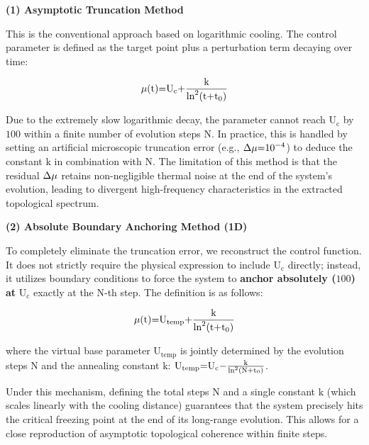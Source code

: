 \documentclass[fractalfract,article,submit,oneauthor,pdftex]{Definitions/mdpi}
\begin{document}
\textbf{(1) Asymptotic Truncation Method}

This is the conventional approach based on logarithmic cooling. The
control parameter is defined as the target point plus a perturbation
term decaying over time:

\begin{equation}
\text{\ensuremath{\mu}}\text{(}\text{t}\text{)=}\text{U}_{\text{c}}\text{+}\frac{\text{k}}{\text{ln}^{\text{2}}\text{(}\text{t}\text{+}\text{t}_{\text{0}}\text{)}}
\end{equation}

Due to the extremely slow logarithmic decay, the parameter cannot reach
\(\text{U}_{\text{c}}\) by \(\text{100}\) within a finite number of
evolution steps \(\text{N}\). In practice, this is handled by setting an
artificial microscopic truncation error (e.g.,
\(\text{\ensuremath{\Delta}}\text{\ensuremath{\mu}}\text{=}\text{10}^{\text{\ensuremath{-}4}}\)) to deduce the
constant \(\text{k}\) in combination with \(\text{N}\). The limitation
of this method is that the residual \(\text{\ensuremath{\Delta}}\text{\ensuremath{\mu}}\) retains
non-negligible thermal noise at the end of the system's evolution,
leading to divergent high-frequency characteristics in the extracted
topological spectrum.

\textbf{(2) Absolute Boundary Anchoring Method (1D)}

To completely eliminate the truncation error, we reconstruct the control
function. It does not strictly require the physical expression to
include \(\text{U}_{\text{c}}\) directly; instead, it utilizes boundary
conditions to force the system to \textbf{anchor absolutely
(}\(\text{100}\)\textbf{) at} \(\text{U}_{\text{c}}\) exactly at the
\(\text{N}\)-th step. The definition is as follows:

\begin{equation}
\text{\ensuremath{\mu}}\text{(}\text{t}\text{)=}\text{U}_{\text{temp}}\text{+}\frac{\text{k}}{\text{ln}^{\text{2}}\text{(}\text{t}\text{+}\text{t}_{\text{0}}\text{)}}
\end{equation}

where the virtual base parameter \(\text{U}_{\text{temp}}\) is jointly
determined by the evolution steps \(\text{N}\) and the annealing
constant \(\text{k}\):
\(\text{U}_{\text{temp}}\text{=}\text{U}_{\text{c}}\text{\ensuremath{-}}\frac{\text{k}}{\text{ln}^{\text{2}}\text{(}\text{N}\text{+}\text{t}_{\text{0}}\text{)}}\).

Under this mechanism, defining the total steps \(\text{N}\) and a single
constant \(\text{k}\) (which scales linearly with the cooling distance)
guarantees that the system precisely hits the critical freezing point at
the end of its long-range evolution. This allows for a close
reproduction of asymptotic topological coherence within finite steps.
\end{document}
